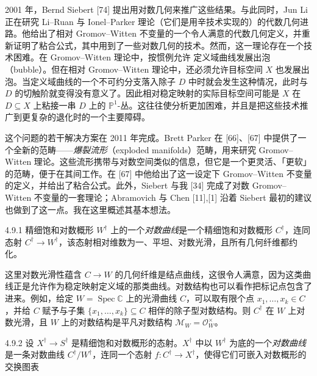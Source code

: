 2001 年，Bernd Siebert [74] 提出用对数几何来推广这些结果。与此同时，Jun Li 正在研究 Li--Ruan 与 Ionel--Parker 理论（它们是用辛技术实现的）的代数几何进路。他给出了相对 Gromov--Witten 不变量的一个令人满意的代数几何定义，并重新证明了粘合公式，其中用到了一些对数几何的技术。然而，这一理论存在一个技术困难。在 Gromov--Witten 理论中，按惯例允许
定义域曲线发展出泡（bubble）。但在相对 Gromov--Witten 理论中，还必须允许目标空间 $X$ 也发展出泡。当定义域曲线的一个不可约分支落入除子 $D$ 中时就会发生这种情况，此时与 $D$ 的切触阶就变得没有意义了。因此相对稳定映射的实际目标空间可能是 $X$ 在 $D\subseteq X$ 上粘接一串 $D$ 上的 $\mathbb{P}^1$-丛。这往往使分析更加困难，并且是把这些技术推广到更复杂的退化时的一个主要障碍。

这个问题的若干解决方案在 2011 年完成。Brett Parker 在 [66]、[67] 中提供了一个全新的范畴------\emph{爆裂流形}（exploded manifolds）范畴，用来研究 Gromov--Witten 理论。这些流形携带与对数空间类似的信息，但它是一个更灵活、「更软」的范畴，便于在其间工作。在 [67] 中他给出了这一设定下 Gromov--Witten 不变量的定义，并给出了粘合公式。此外，Siebert 与我 [34] 完成了对数 Gromov--Witten 不变量的一套理论；Abramovich 与 Chen [11],[1] 沿着 Siebert 最初的建议也做到了这一点。我在这里概述其基本想法。

\begin{definition}{4.9.1}
精细饱和对数概形 $W^\dagger$ 上的一个\emph{对数曲线}是一个精细饱和对数概形 $C^\dagger$，连同态射 $C^\dagger\to W^\dagger$，该态射相对维数为一、平坦、对数光滑，且所有几何纤维都约化。
\end{definition}

这里对数光滑性蕴含 $C\to W$ 的几何纤维是结点曲线，这很令人满意，因为这类曲线正是允许作为稳定映射定义域的那类曲线。对数结构也可以看作把标记点包含了进来。例如，给定 $W=\operatorname{Spec}\mathbb{C}$ 上的光滑曲线 $C$，可以取有限个点 $x_1,\dots,x_k\in C$，并给 $C$ 赋予与子集 $\{x_1,\dots,x_k\}\subseteq C$ 相伴的除子型对数结构。则 $C^\dagger$ 在 $W$ 上对数光滑，且 $W$ 上的对数结构是平凡对数结构 $\mathcal{M}_W=\mathcal{O}_W^\times$。

\begin{definition}{4.9.2}
设 $X^\dagger\to S^\dagger$ 是精细饱和对数概形的态射。$X^\dagger$ 中以 $W^\dagger$ 为底的一个\emph{对数曲线}是一条对数曲线 $C^\dagger/W^\dagger$，连同一个态射 $f:C^\dagger\to X^\dagger$，使得它们可嵌入对数概形的交换图表
\begin{center}
\end{center}
\end{definition}

